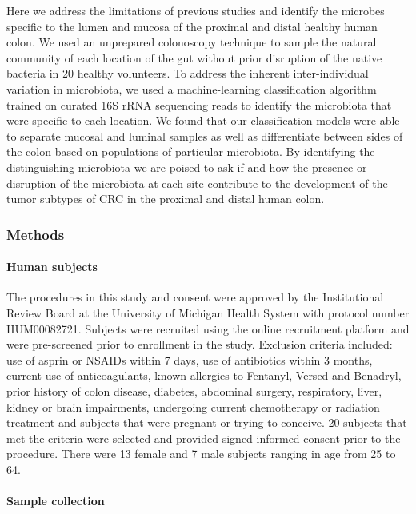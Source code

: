 \documentclass[12pt,]{article}
\let\oldparagraph\paragraph
\renewcommand{\paragraph}[1]{\oldparagraph{#1}\mbox{}}
\begin{document}
Here we address the limitations of previous studies and identify the
microbes specific to the lumen and mucosa of the proximal and distal
healthy human colon. We used an unprepared colonoscopy technique to
sample the natural community of each location of the gut without prior
disruption of the native bacteria in 20 healthy volunteers. To address
the inherent inter-individual variation in microbiota, we used a
machine-learning classification algorithm trained on curated 16S rRNA
sequencing reads to identify the microbiota that were specific to each
location. We found that our classification models were able to separate
mucosal and luminal samples as well as differentiate between sides of
the colon based on populations of particular microbiota. By identifying
the distinguishing microbiota we are poised to ask if and how the
presence or disruption of the microbiota at each site contribute to the
development of the tumor subtypes of CRC in the proximal and distal
human colon.

\subsubsection{Methods}\label{methods}

\paragraph{Human subjects}\label{human-subjects}

The procedures in this study and consent were approved by the
Institutional Review Board at the University of Michigan Health System
with protocol number HUM00082721. Subjects were recruited using the
online recruitment platform and were pre-screened prior to enrollment in
the study. Exclusion criteria included: use of asprin or NSAIDs within 7
days, use of antibiotics within 3 months, current use of anticoagulants,
known allergies to Fentanyl, Versed and Benadryl, prior history of colon
disease, diabetes, abdominal surgery, respiratory, liver, kidney or
brain impairments, undergoing current chemotherapy or radiation
treatment and subjects that were pregnant or trying to conceive. 20
subjects that met the criteria were selected and provided signed
informed consent prior to the procedure. There were 13 female and 7 male
subjects ranging in age from 25 to 64.

\paragraph{Sample collection}\label{sample-collection}
\end{document}

